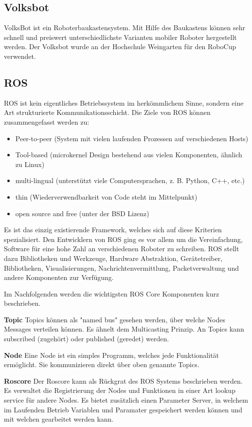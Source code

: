 \documentclass[12pt]{article}
\begin{document}
\subsection{Volksbot}

VolksBot ist ein Roboterbaukastensystem.
Mit Hilfe des Baukastens können sehr schnell und preiswert unterschiedlichste Varianten mobiler Roboter hergestellt werden.
Der Volksbot wurde an der Hochschule Weingarten für den RoboCup verwendet.
\subsection{ROS}
ROS ist kein eigentliches Betriebssystem im herkömmlichem Sinne, sondern eine Art strukturierte Kommunikationsschicht.
Die Ziele von ROS können zusammengefasst werden zu:
\begin{itemize}
\item Peer-to-peer (System mit vielen laufenden Prozessen auf verschiedenen Hosts)
\item Tool-based (microkernel Design bestehend aus vielen Komponenten, ähnlich zu Linux)
\item multi-lingual (unterstützt viele Computersprachen, z. B. Python, C++, etc.)
\item thin (Wiederverwendbarkeit von Code steht im Mittelpunkt)
\item open source and free (unter der BSD Lizenz)
\end{itemize}
Es ist das einzig existierende Framework, welches sich auf diese Kriterien spezialisiert.
Den Entwicklern von ROS ging es vor allem um die Vereinfachung, Software für eine hohe Zahl an verschiedenen Roboter zu schreiben.
ROS stellt dazu Bibliotheken und Werkzeuge, Hardware Abstraktion, Gerätetreiber, Bibliotheken, Visualisierungen, Nachrichtenvermittlung, Packetverwaltung und andere Komponenten zur Verfügung.

Im Nachfolgenden werden die wichtigsten ROS Core Komponenten kurz beschrieben.

{\bf Topic} Topics können als "named bus" gesehen werden, über welche Nodes Messages verteilen können. Es ähnelt dem Multicasting Prinzip. An Topics kann subscribed (zugehört) oder published (geredet) werden.

{\bf Node} Eine Node ist ein simples Programm, welches jede Funktionalität ermöglicht.  Sie kommunizieren direkt über oben genannte Topics.

{\bf Roscore} Der Roscore kann als Rückgrat des ROS Systems beschrieben werden. Es verwaltet die Registrierung der Nodes und Funktionen in einer Art lookup service für andere Nodes. Es bietet zusätzlich einen Parameter Server, in welchem im Laufenden Betrieb Variablen und Paramater gespeichert werden können und mit welchen gearbeitet werden kann.
\end{document}
